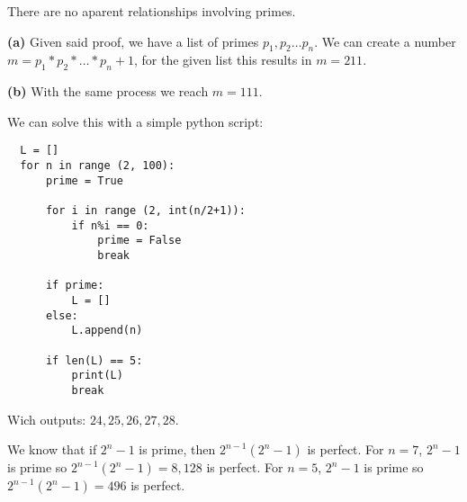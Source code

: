 There are no aparent relationships involving primes.  


\sol \textbf{(a)} Given said proof, we have a list of primes $p_1,p_2 \ldots p_n$.
We can create a number $m = p_1 * p_2 * \ldots * p_n + 1$, for the given list this results in $m = 211$.

\sol \textbf{(b)} With the same process we reach $m = 111$.


\sol 
We can solve this with a simple python script:
\begin{verbatim}
  L = []
  for n in range (2, 100):
      prime = True

      for i in range (2, int(n/2+1)):
          if n%i == 0:
              prime = False
              break

      if prime:
          L = []
      else:
          L.append(n)

      if len(L) == 5:
          print(L)
          break
\end{verbatim}
Wich outputs: $24, 25, 26, 27, 28$.
 

\sol We know that if $2^n - 1$ is prime, then $2^{n-1}(2^n -1)$ is perfect.
For $n = 7$, $2^n - 1$ is prime so $2^{n-1}(2^n -1) = 8,128$ is perfect.
For $n = 5$, $2^n - 1$ is prime so $2^{n-1}(2^n -1) = 496$ is perfect.

\newpage

